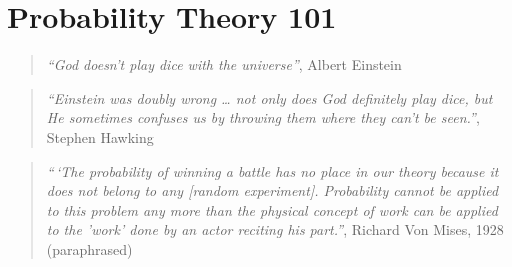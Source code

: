 \chapter{Probability Theory 101}\label{probabilitychap}


\begin{quote}
\emph{``God doesn't play dice with the universe''}, Albert Einstein
\end{quote}

\begin{quote}
\emph{``Einstein was doubly wrong \ldots{} not only does God definitely
play dice, but He sometimes confuses us by throwing them where they
can't be seen.''}, Stephen Hawking
\end{quote}

\begin{quote}
\emph{``\,`The probability of winning a battle has no place in our
theory because it does not belong to any {[}random experiment{]}.
Probability cannot be applied to this problem any more than the physical
concept of work can be applied to the 'work' done by an actor reciting
his part.''}, Richard Von Mises, 1928 (paraphrased)
\end{quote}

